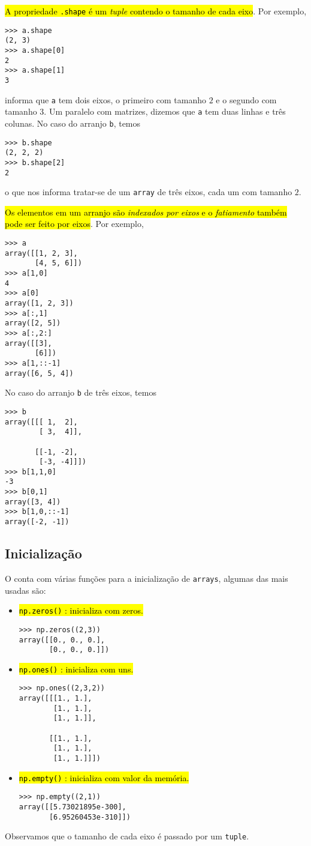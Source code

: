 \hl{A propriedade {\lstinline+.shape+} é um \textit{tuple} contendo o tamanho de cada eixo}. Por exemplo,
\begin{lstlisting}
>>> a.shape
(2, 3)
>>> a.shape[0]
2
>>> a.shape[1]
3
\end{lstlisting}
informa que \lstinline+a+ tem dois eixos, o primeiro com tamanho $2$ e o segundo com tamanho $3$. Um paralelo com matrizes, dizemos que \lstinline+a+ tem duas linhas e três colunas. No caso do arranjo \lstinline+b+, temos
\begin{lstlisting}
>>> b.shape
(2, 2, 2)
>>> b.shape[2]
2
\end{lstlisting}
o que nos informa tratar-se de um \lstinline+array+ de três eixos, cada um com tamanho $2$.

\hl{Os elementos em um arranjo são \emph{indexados por eixos} e o \emph{fatiamento} também pode ser feito por eixos}. Por exemplo,
\begin{lstlisting}
>>> a
array([[1, 2, 3],
       [4, 5, 6]])
>>> a[1,0]
4
>>> a[0]
array([1, 2, 3])
>>> a[:,1]
array([2, 5])
>>> a[:,2:]
array([[3],
       [6]])
>>> a[1,::-1]
array([6, 5, 4])
\end{lstlisting}
No caso do arranjo \lstinline+b+ de três eixos, temos
\begin{lstlisting}
>>> b
array([[[ 1,  2],
        [ 3,  4]],

       [[-1, -2],
        [-3, -4]]])
>>> b[1,1,0]
-3
>>> b[0,1]
array([3, 4])
>>> b[1,0,::-1]
array([-2, -1])
\end{lstlisting}

\subsection{Inicialização}

O {\numpy} conta com várias funções para a inicialização de \lstinline+arrays+, algumas das mais usadas são:
\begin{itemize}
\item \hl{{\lstinline+np.zeros()+} : inicializa com zeros.}
\begin{lstlisting}
>>> np.zeros((2,3))
array([[0., 0., 0.],
       [0., 0., 0.]])
\end{lstlisting}
\item \hl{{\lstinline+np.ones()+} : inicializa com uns.}
\begin{lstlisting}
>>> np.ones((2,3,2))
array([[[1., 1.],
        [1., 1.],
        [1., 1.]],

       [[1., 1.],
        [1., 1.],
        [1., 1.]]])
\end{lstlisting}
\item \hl{{\lstinline+np.empty()+} : inicializa com valor da memória.}
\begin{lstlisting}
>>> np.empty((2,1))
array([[5.73021895e-300],
       [6.95260453e-310]])
\end{lstlisting}
\end{itemize}
Observamos que o tamanho de cada eixo é passado por um \lstinline+tuple+.

